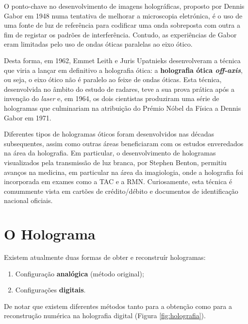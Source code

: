 O ponto-chave no desenvolvimento de imagens holográficas, proposto por Dennis Gabor em 1948 numa tentativa de melhorar a microscopia eletrónica, é o uso de uma fonte de luz de referência para codificar uma onda sobreposta com outra a fim de registar os padrões de interferência\cite{GABOR1948}. Contudo, as experiências de Gabor eram limitadas pelo uso de ondas óticas paralelas ao eixo ótico\cite{Image2018}.

Desta forma, em 1962, Emmet Leith e Juris Upatnieks desenvolveram a técnica que viria a lançar em definitivo a holografia ótica: a \textbf{holografia ótica \textit{off-axis}}\cite{Leith1962}, ou seja, o eixo ótico não é paralelo ao feixe de ondas óticas. Esta técnica, desenvolvida no âmbito do estudo de radares, teve a sua prova prática após a invenção do \textit{laser} e, em 1964, os dois cientistas produziram uma série de hologramas que culminariam na atribuição do Prémio Nóbel da Física a Dennis Gabor em 1971\cite{Leith1962,nobel1971}.

Diferentes tipos de hologramas óticos foram desenvolvidos nas décadas subsequentes, assim como outras áreas beneficiaram com os estudos enveredados na área da holografia\cite{Image2018}. Em particular, o desenvolvimento de hologramas visualizados pela transmissão de luz branca, por Stephen Benton\cite{benton1977}, permitiu avanços na medicina, em particular na área da imagiologia, onde a holografia foi incorporada em exames como a \ac{TAC} e a \ac{RMN}\cite{Saxon2003}. Curiosamente, esta técnica é comummente vista em cartões de crédito/débito e documentos de identificação nacional oficiais\cite{Saxon2003,Toal2012}.




\section{O Holograma}
\label{sec::estado-arte:holograma}

Existem atualmente duas formas de obter e reconstruír hologramas\cite{Image2018}:
\begin{enumerate}
  \item Configuração \textbf{analógica} (método original);
  \item Configurações \textbf{digitais}.
\end{enumerate}

De notar que existem diferentes métodos tanto para a obtenção como para a reconstrução numérica na holografia digital (Figura \ref{fig:holografia}).

